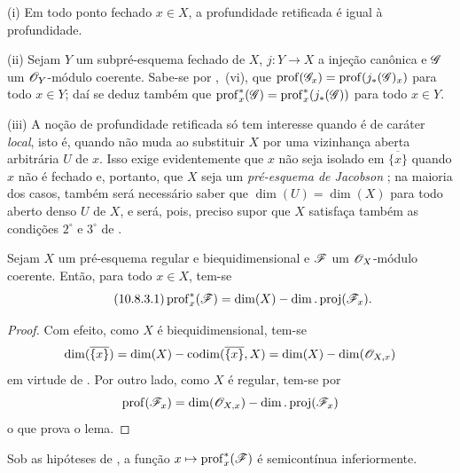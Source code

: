 \begin{remarks}[10.8.2]
\label{IV.10.8.2}
(i) Em todo ponto fechado $x\in X$, a profundidade retificada é igual à profundidade.

(ii) Sejam $Y$ um subpré-esquema fechado de $X$, $j:Y\to X$ a injeção canônica e $\mathscr{G}$ um $\mathscr{O}_Y$-módulo coerente.
Sabe-se por ,~(vi), que $\operatorname{prof}(\mathscr{G}_x)=\operatorname{prof}(j_*(\mathscr{G})_x)$ para todo $x\in Y$; daí se deduz também que $\operatorname{prof}^{*}_{x}(\mathscr{G})=\operatorname{prof}^{*}_{x}(j_*(\mathscr{G}))$ para todo $x\in Y$.

(iii) A noção de profundidade retificada só tem interesse quando é de caráter \emph{local}, isto é, quando não muda ao substituir $X$ por uma vizinhança aberta arbitrária $U$ de $x$.
Isso exige evidentemente que $x$ não seja isolado em $\overline{\{x\}}$ quando $x$ não é fechado e, portanto, que $X$ seja um \emph{pré-esquema de Jacobson} ; na maioria dos casos, também será necessário saber que $\dim(U)=\dim(X)$ para todo aberto denso $U$ de $X$, e será, pois, preciso supor que $X$ satisfaça também as condições $2^\circ$ e $3^\circ$ de .
\end{remarks}

\begin{lemma}[10.8.3]
\label{IV.10.8.3}
Sejam $X$ um pré-esquema regular e biequidimensional e $\mathscr{F}$ um $\mathscr{O}_X$-módulo coerente.
Então, para todo $x\in X$, tem-se
\begin{equation}
\label{IV.10.8.3.1}
\tag{10.8.3.1}
\operatorname{prof}^{*}_{x}(\sh{F})
=\dim(X)-\dim.\operatorname{proj}(\sh{F}_x).
\end{equation}
\end{lemma}

\begin{proof}
Com efeito, como $X$ é biequidimensional, tem-se 
\[
  \dim(\overline{\{x\}})=\dim(X)-\operatorname{codim}(\overline{\{x\}},X)
  =\dim(X)-\dim(\mathscr{O}_{X,x})
\]
em virtude de .
Por outro lado, como $X$ é regular, tem-se por 
\[
  \operatorname{prof}(\mathscr{F}_x)
  =\dim(\mathscr{O}_{X,x})-\dim.\operatorname{proj}(\mathscr{F}_x)
\]
o que prova o lema.
\end{proof}

\begin{corollary}[10.8.4]
\label{IV.10.8.4}
Sob as hipóteses de , a função $x\mapsto\operatorname{prof}^{*}_{x}(\sh{F})$ é semicontínua inferiormente.
\end{corollary}

